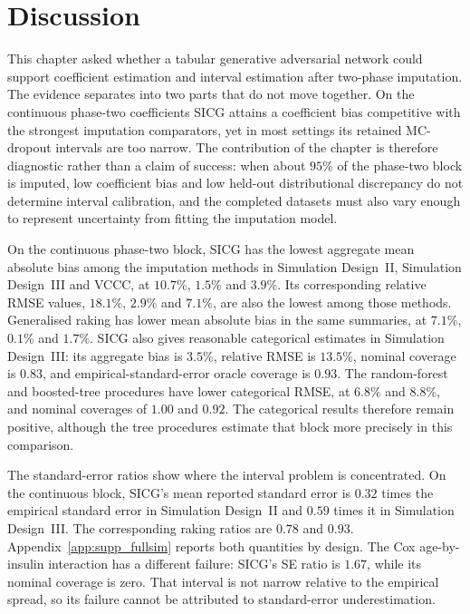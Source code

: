 \section{Discussion}
\label{sec:sicg_discussion}

This chapter asked whether a tabular generative adversarial network could support coefficient estimation and interval estimation after two-phase imputation. The evidence separates into two parts that do not move together. On the continuous phase-two coefficients SICG attains a coefficient bias competitive with the strongest imputation comparators, yet in most settings its retained MC-dropout intervals are too narrow. The contribution of the chapter is therefore diagnostic rather than a claim of success: when about \(95\%\) of the phase-two block is imputed, low coefficient bias and low held-out distributional discrepancy do not determine interval calibration, and the completed datasets must also vary enough to represent uncertainty from fitting the imputation model.

On the continuous phase-two block, SICG has the lowest aggregate mean absolute bias among the imputation methods in Simulation Design~II, Simulation Design~III and VCCC, at \(10.7\%\), \(1.5\%\) and \(3.9\%\). Its corresponding relative RMSE values, \(18.1\%\), \(2.9\%\) and \(7.1\%\), are also the lowest among those methods. Generalised raking has lower mean absolute bias in the same summaries, at \(7.1\%\), \(0.1\%\) and \(1.7\%\). SICG also gives reasonable categorical estimates in Simulation Design~III: its aggregate bias is \(3.5\%\), relative RMSE is \(13.5\%\), nominal coverage is \(0.83\), and empirical-standard-error oracle coverage is \(0.93\). The random-forest and boosted-tree procedures have lower categorical RMSE, at \(6.8\%\) and \(8.8\%\), and nominal coverages of \(1.00\) and \(0.92\). The categorical results therefore remain positive, although the tree procedures estimate that block more precisely in this comparison.

The standard-error ratios show where the interval problem is concentrated. On the continuous block, SICG's mean reported standard error is \(0.32\) times the empirical standard error in Simulation Design~II and \(0.59\) times it in Simulation Design~III. The corresponding raking ratios are \(0.78\) and \(0.93\). Appendix~\ref{app:supp_fullsim} reports both quantities by design. The Cox age-by-insulin interaction has a different failure: SICG's SE ratio is \(1.67\), while its nominal coverage is zero. That interval is not narrow relative to the empirical spread, so its failure cannot be attributed to standard-error underestimation.

